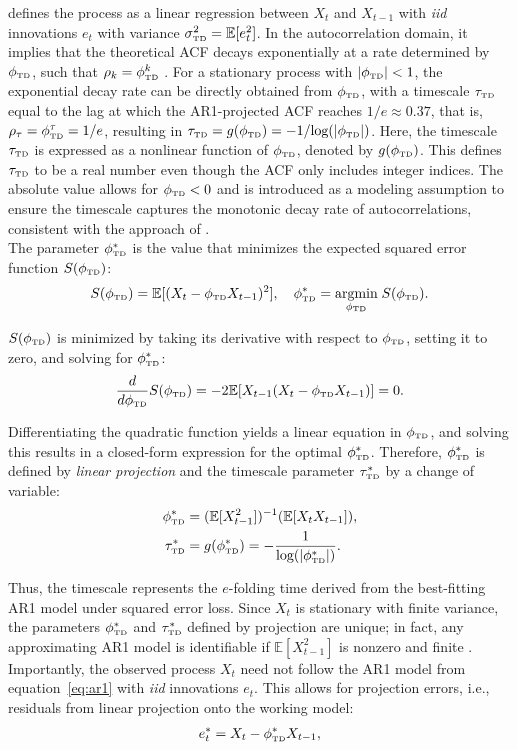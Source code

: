 \documentclass[docs/main.tex]{subfiles}
\begin{document}
\noindent defines the process as a linear regression between $X_t$ and $X_{t-1}$ with \textit{iid} innovations $e_t$ with variance $\sigma_{\scriptscriptstyle\text{TD}}^2 = \mathbb{E}[e_t^2]$. In the autocorrelation domain, it implies that the theoretical ACF decays exponentially at a rate determined by $\phi_{\scriptscriptstyle\text{TD}}$, such that $\rho_k = \phi_{\scriptscriptstyle\text{TD}}^k$ \citep[Chapter~14.22]{hansen_econometrics_2022}. For a stationary process with $|\phi_{\scriptscriptstyle\text{TD}}|<1$, the exponential decay rate can be directly obtained from $\phi_{\scriptscriptstyle\text{TD}}$, with a timescale $\tau_{\scriptscriptstyle\text{TD}}$ equal to the lag at which the AR1-projected ACF reaches $1/e\approx 0.37$, that is,  $\rho_\tau = \phi_{\scriptscriptstyle\text{TD}}^\tau = 1/e$, resulting in $\tau_{\scriptscriptstyle\text{TD}} = g(\phi_{\scriptscriptstyle\text{TD}}) = -1/\text{log}(|\phi_{\scriptscriptstyle\text{TD}}|)$. Here, the timescale $\tau_{\scriptscriptstyle\text{TD}}$ is expressed as a nonlinear function of $\phi_{\scriptscriptstyle\text{TD}}$, denoted by $g(\phi_{\scriptscriptstyle\text{TD}})$. This defines $\tau_{\scriptscriptstyle\text{TD}}$ to be a real number even though the ACF only includes integer indices. The absolute value allows for $\phi_{\scriptscriptstyle\text{TD}}<0$ and is introduced as a modeling assumption to ensure the timescale captures the monotonic decay rate of autocorrelations, consistent with the approach of \citet{murray_hierarchy_2014}.\\

The parameter $\phi_{\scriptscriptstyle\text{TD}}^*$ is the value that minimizes the expected squared error function $S(\phi_{\scriptscriptstyle\text{TD}})$:
\begin{align}
    S(\phi_{\scriptscriptstyle\text{TD}}) = \mathbb{E}[(X_t - \phi_{\scriptscriptstyle\text{TD}} X_{t-1})^2],\quad \phi_{\scriptscriptstyle\text{TD}}^* = \underset{\phi_{\scriptscriptstyle\text{TD}}}{\text{argmin}} \; S(\phi_{\scriptscriptstyle\text{TD}}).
\end{align}

\noindent $S(\phi_{\scriptscriptstyle\text{TD}})$ is minimized by taking its derivative with respect to $\phi_{\scriptscriptstyle\text{TD}}$, setting it to zero, and solving for $\phi_{\scriptscriptstyle\text{TD}}^*$:
\begin{align}
    \frac{d}{d\phi_{\scriptscriptstyle\text{TD}}} S(\phi_{\scriptscriptstyle\text{TD}}) = -2 \mathbb{E}[X_{t-1}(X_t - \phi_{\scriptscriptstyle\text{TD}} X_{t-1})] = 0.
\end{align}

\noindent Differentiating the quadratic function yields a linear equation in $\phi_{\scriptscriptstyle\text{TD}}$, and solving this results in a closed-form expression for the optimal $\phi_{\scriptscriptstyle\text{TD}}^*$. Therefore, $\phi_{\scriptscriptstyle\text{TD}}^*$ is defined by \textit{linear projection} and the timescale parameter $\tau_{\scriptscriptstyle\text{TD}}^*$ by a change of variable:
\begin{align}
    \phi_{\scriptscriptstyle\text{TD}}^* &= (\mathbb{E}[X_{t-1}^2])^{-1}(\mathbb{E}[X_t X_{t-1}]) \label{eq:ar1-phi},\\
    \tau_{\scriptscriptstyle\text{TD}}^* &= g(\phi_{\scriptscriptstyle\text{TD}}^*) = -\frac{1}{\text{log}(|\phi_{\scriptscriptstyle\text{TD}}^*|)}. \label{eq:ar1-tau}
\end{align}

\noindent Thus, the timescale represents the $e$-folding time derived from the best-fitting AR1 model under squared error loss. Since $X_t$ is stationary with finite variance, the parameters $\phi_{\scriptscriptstyle\text{TD}}^*$ and $\tau_{\scriptscriptstyle\text{TD}}^*$ defined by projection are unique; in fact, any approximating AR1 model is identifiable if $\mathbb{E}[X_{t-1}^2]$ is nonzero and finite \citep[Theorem~14.28]{hansen_econometrics_2022}. Importantly, the observed process $X_t$ need not follow the AR1 model from equation~\eqref{eq:ar1} with \textit{iid} innovations $e_t$. This allows for projection errors, i.e., residuals from linear projection onto the working model:
\begin{align}
    e_t^* = X_t - \phi_{\scriptscriptstyle\text{TD}}^* X_{t-1},
\end{align}
\end{document}
